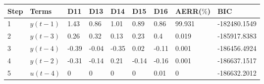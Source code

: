 \begin{tabular}{lllllllll}
Step & Terms & D11 & D13 & D14 & D15 & D16 & AERR($\%$) & BIC \\ 
\hline 
1 & $y(t-1)$ & 1.43 & 0.86 & 1.01 & 0.89 & 0.86 & 99.931 & -182480.1549 \\ 
2 & $y(t-3)$ & 0.26 & 0.32 & 0.13 & 0.23 & 0.4 & 0.019 & -185917.8383 \\ 
3 & $y(t-4)$ & -0.39 & -0.04 & -0.35 & 0.02 & -0.11 & 0.001 & -186456.4924 \\ 
4 & $y(t-2)$ & -0.31 & -0.14 & 0.21 & -0.14 & -0.16 & 0.001 & -186637.1517 \\ 
5 & $u(t-4)$ & 0 & 0 & 0 & 0 & 0.01 & 0 & -186632.2012 \\ 
\hline 
\end{tabular}